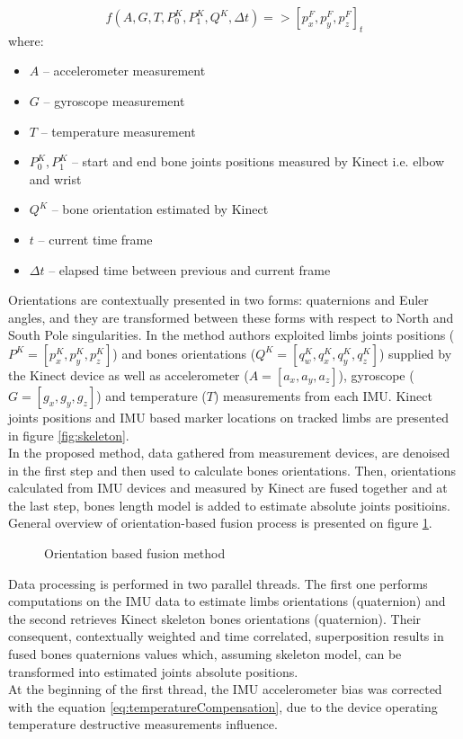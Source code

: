 \documentclass[9pt]{llncs}
\begin{document}
\begin{equation}
	\label{eq:generalForm}
	f(A,G,T,P_0^K,P_1^K,Q^K,\Delta t) => [p_x^F,p_y^F,p_z^F]_t
\end{equation}
where:
\begin{itemize}
	\item $A$ -- accelerometer measurement
	\item $G$ -- gyroscope measurement
	\item $T$ -- temperature measurement
	\item $P_0^K,P_1^K$ -- start and end bone joints positions measured by Kinect i.e. elbow and wrist
	\item $Q^K$ -- bone orientation estimated by Kinect
	\item $t$ -- current time frame
	\item $\Delta t$ -- elapsed time between previous and current frame
\end{itemize}

Orientations are contextually presented in two forms: quaternions and Euler angles, and they are transformed between these forms with respect to North and South Pole singularities. In the method authors exploited limbs joints positions ($P^K=[p_x^K,p_y^K,p_z^K]$) and bones orientations ($Q^K=[q_w^K,q_x^K,q_y^K,q_z^K]$) supplied by the Kinect device as well as accelerometer ($A=[a_x,a_y,a_z]$), gyroscope ($G=[g_x,g_y,g_z]$) and temperature ($T$) measurements from each IMU. Kinect joints positions and IMU based marker locations on tracked limbs are presented in figure \ref{fig:skeleton}. \\
In the proposed method, data gathered from measurement devices, are denoised in the first step and then used to calculate bones orientations. Then, orientations calculated from IMU devices and measured by Kinect are fused together and at the last step, bones length model is added to estimate absolute joints positioins. General overview of orientation-based fusion process is presented on figure \ref{fig:orientationBasedMethod}.
 
\begin{figure}[!htb]
	\vspace{2.5cm}
	\caption{Orientation based fusion method}
	\label{fig:orientationBasedMethod}
\end{figure}

Data processing is performed in two parallel threads. The first one performs computations on the IMU data to estimate limbs orientations (quaternion) and the second retrieves Kinect skeleton bones orientations (quaternion). Their consequent, contextually weighted and time correlated, superposition results in fused bones quaternions values which, assuming skeleton model, can be transformed into estimated joints absolute positions.\\
At the beginning of the first thread, the IMU accelerometer bias was corrected with the equation \ref{eq:temperatureCompensation}, due to the device operating temperature destructive measurements influence.
\end{document}
